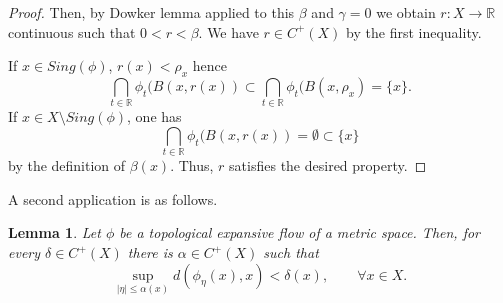 \documentclass[11pt,letterpaper]{amsart}
\newtheorem{lemma}[thm]{Lemma}
\begin{document}
\begin{proof}
Then, by Dowker lemma applied to this $\beta$ and $\gamma=0$ we obtain
$r:X\to \mathbb{R}$ continuous such that $0<r<\beta$.
We have $r\in C^+(X)$ by the first inequality.

If $x\in Sing(\phi)$, $r(x)<\rho_x$ hence
$$
\bigcap_{t\in\mathbb{R}}\phi_t(B(x,r(x))\subset \bigcap_{t\in\mathbb{R}}\phi_t(B(x,\rho_x)=\{x\}.
$$
If $x\in X\setminus Sing(\phi)$, one has
$$
\bigcap_{t\in\mathbb{R}}\phi_t(B(x,r(x))=\emptyset\subset \{x\}
$$
by the definition of $\beta(x)$.
Thus, $r$ satisfies the desired property.
\end{proof}

A second application is as follows.

\begin{lemma}
\label{mcoy}
Let $\phi$ be a topological expansive flow of a metric space.
Then, for every $\delta\in C^+(X)$ there is $\alpha\in C^+(X)$ such that
\begin{equation}
\label{sistema}
\sup_{|\eta|\leq \alpha(x)}d(\phi_\eta(x),x)< \delta(x),\quad\quad\forall x\in X.
\end{equation}
\end{lemma}
\end{document}
